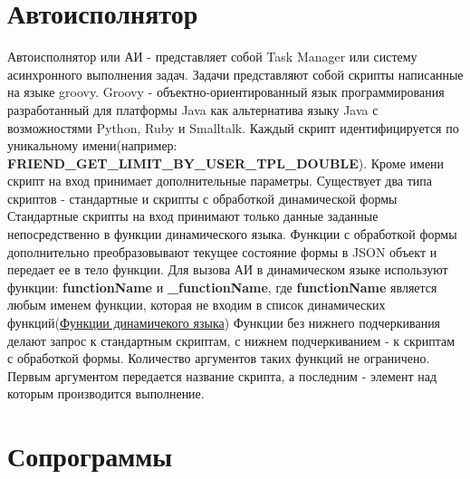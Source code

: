 \documentclass[../index.tex]{subfiles}
\begin{document}
\section{Автоисполнятор}
Автоисполнятор или АИ - представляет собой Task Manager или систему асинхронного выполнения задач. Задачи представляют собой скрипты написанные на языке groovy. Groovy - объектно-ориентированный язык программирования разработанный для платформы Java как альтернатива языку Java с возможностями Python, Ruby и Smalltalk. Каждый скрипт идентифицируется по уникальному имени(например: \textbf{FRIEND_GET_LIMIT_BY_USER_TPL_DOUBLE}). Кроме имени скрипт на вход принимает дополнительные параметры. 
Существует два типа скриптов - стандартные и скрипты с обработкой динамической формы
Стандартные скрипты на вход принимают только данные заданные непосредственно в функции динамического языка. Функции с обработкой формы дополнительно преобразовывают текущее состояние формы в JSON объект и передает ее в тело функции.
Для вызова АИ в динамическом языке используют функции: \textbf{functionName}  и \textbf{_functionName}, где \textbf{functionName} является любым именем функции, которая не входим в список динамических функций(\hyperref[sec:dlib_doc]{Функции динамичекого языка})
Функции без нижнего подчеркивания делают запрос к стандартным скриптам, с нижнем подчеркиванием - к скриптам с обработкой формы.
Количество аргументов таких функций не ограничено. Первым аргументом передается название скрипта, а последним - элемент над которым производится выполнение.

\section{Сопрограммы}
\end{document}
